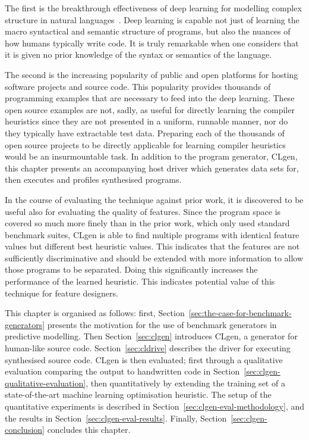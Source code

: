The first is the breakthrough effectiveness of deep learning for modelling complex structure in natural languages~\cite{Graves2013,Sutskever2014}. Deep learning is capable not just of learning the macro syntactical and semantic structure of programs, but also the nuances of how humans typically write code. It is truly remarkable when one considers that it is given no prior knowledge of the syntax or semantics of the language.

The second is the increasing popularity of public and open platforms for hosting software projects and source code. This popularity provides thousands of programming examples that are necessary to feed into the deep learning. These open source examples are not, sadly, as useful for directly learning the compiler heuristics since they are not presented in a uniform, runnable manner, nor do they typically have extractable test data. Preparing each of the thousands of open source projects to be directly applicable for learning compiler heuristics would be an insurmountable task. In addition to the program generator, CLgen, this chapter presents an accompanying host driver which generates data sets for, then executes and profiles synthesised programs.

In the course of evaluating the technique against prior work, it is discovered to be useful also for evaluating the quality of features. Since the program space is covered so much more finely than in the prior work, which only used standard benchmark suites, CLgen is able to find multiple programs with identical feature values but different best heuristic values. This indicates that the features are not sufficiently discriminative and should be extended with more information to allow those programs to be separated. Doing this significantly increases the performance of the learned heuristic. This indicates potential value of this technique for feature designers.

This chapter is organised as follows: first, Section~\ref{sec:the-case-for-benchmark-generators} presents the motivation for the use of benchmark generators in predictive modelling. Then Section~\ref{sec:clgen} introduces CLgen, a generator for human-like source code. Section~\ref{sec:cldrive} describes the driver for executing synthesised source code. CLgen is then evaluated; first through a qualitative evaluation comparing the output to handwritten code in Section~\ref{sec:clgen-qualitative-evaluation}, then quantitatively by extending the training set of a state-of-the-art machine learning optimisation heuristic. The setup of the quantitative experiments is described in Section~\ref{sec:clgen-eval-methodology}, and the results in Section~\ref{sec:clgen-eval-results}. Finally, Section~\ref{sec:clgen-conclusion} concludes this chapter.
